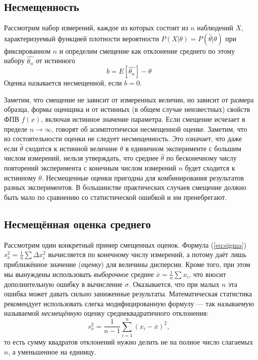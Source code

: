 \subsection{Несмещенность}

Рассмотрим набор измерений, каждое из которых состоит из $n$
наблюдений $X$, характеризуемый функцией плотности вероятности
$P(X | \theta) = P(\hat\theta | \theta)$ при фиксированном $n$ и
определим смещение как отклонение среднего по этому набору
$\hat{\theta_n}$ от истинного \begin{equation}
   b = E[\hat{\theta_n}] - \theta
\end{equation} Оценка называется несмещенной, если $b = 0$.

Заметим, что смещение не зависит от измеренных величин, но зависит от
размера образца, формы оценщика и от истинных (в общем случае
неизвестных) свойств ФПВ $f(x)$, включая истинное значение параметра.
Если смещение исчезает в пределе $n \to \infty$, говорят об
асимптотически несмещенной оценке. Заметим, что из состоятельности
оценки не следует несмещенность. Это означает, что даже если
$\hat{\theta}$ сходится к истинной величине $\theta$ в единичном
эксперименте с большим числом измерений, нельзя утверждать, что среднее
$\hat{\theta}$ по бесконечному числу повторений эксперимента с
конечным числом измерений $n$ будет сходится к истинному $\theta$.
Несмещенные оценки пригодны для комбинирования результатов разных
экспериментов. В большинстве практических случаев смещение должно быть
мало по сравнению со статистической ошибкой и им пренебрегают.

\subsection{Несмещённая оценка среднего}


Рассмотрим один конкретный пример смещенных оценок. Формула (\ref{eq:sigma}) $s_{x}^{2}=\frac{1}{n}\sum\Delta x_{i}^{2}$
вычисляется по конечному числу измерений, а потому даёт лишь приближённое
значение (\emph{оценку}) для величины дисперсии. Кроме того, при этом
мы вынуждены использовать \emph{выборочное} среднее $\overline{x}=\frac{1}{n}\sum x_{i}$,
что вносит дополнительную ошибку в вычисление $\sigma$. Оказывается,
что при малых $n$ эта ошибка может давать сильно заниженные результаты.
Математическая статистика рекомендует использовать слегка модифицированную
формулу --- так называемую называемой \emph{несмещённую}
оценку среднеквадратичного отклонения:
\begin{equation}
\boxed{s_{x}^{2}=\frac{1}{n-1}\sum\limits _{i=1}^{n}\left(x_{i}-\overline{x}\right)^{2}},\label{eq:sigma_straight}
\end{equation}
то есть сумму квадратов отклонений нужно делить не на полное число
слагаемых $n$, а уменьшенное на единицу.

